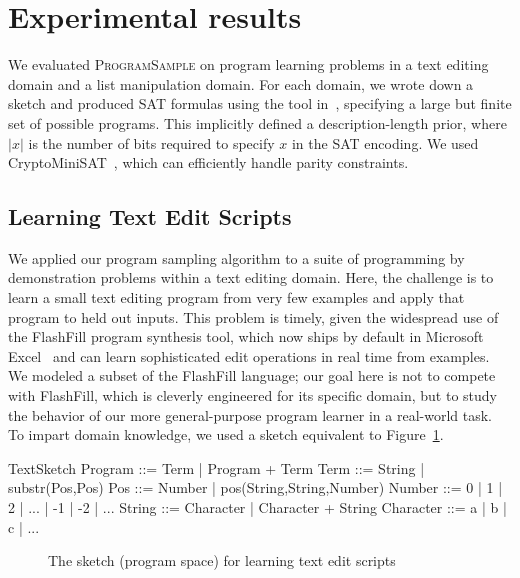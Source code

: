\documentclass{article}
\newcommand{\theSystem}{\textsc{ProgramSample}}
\begin{document}
 

     
  \section{Experimental results}

  We evaluated \theSystem{} on program learning problems in a text editing domain and a list manipulation domain.
  For each domain, we wrote down a sketch and produced SAT formulas using the tool in~\cite{solar2008program}, specifying a large but finite set of possible programs.
  This implicitly defined a description-length prior, where $\lvert x \rvert $ is the number of bits required to specify $x$ in the SAT encoding.
We used   CryptoMiniSAT~\cite{crypto}, which can efficiently handle parity constraints.
  

\subsection{Learning Text Edit Scripts}
We applied our program sampling algorithm to a suite of programming by
demonstration problems within a text editing domain.  Here, the
challenge is to learn a small text editing program from very few
examples and apply that program to held out inputs.  This problem is
timely, given the widespread use of the FlashFill program synthesis
tool, which now ships by default in Microsoft Excel~\cite{gulwani2011automating}
and can learn sophisticated edit operations in real time from
examples.  We modeled a subset of the
FlashFill language; our goal
here is not to compete with FlashFill, which is cleverly engineered for
its specific domain, but to study the behavior of our more
general-purpose program learner in a real-world task.  To impart
domain knowledge, we used a sketch equivalent to Figure~\ref{textGrammar}.

\begin{SaveVerbatim}[]{TextSketch}
Program ::= Term | Program + Term
Term    ::= String | substr(Pos,Pos)
Pos     ::= Number
         |  pos(String,String,Number)
Number  ::= 0 | 1 | 2 | ... 
         | -1 | -2 | ...
String  ::= Character 
         |  Character + String
Character ::= a | b | c | ...
\end{SaveVerbatim}

\begin{figure}\centering
  \caption{The sketch (program space) for learning text edit scripts}\label{textGrammar}
\end{figure}
\end{document}
